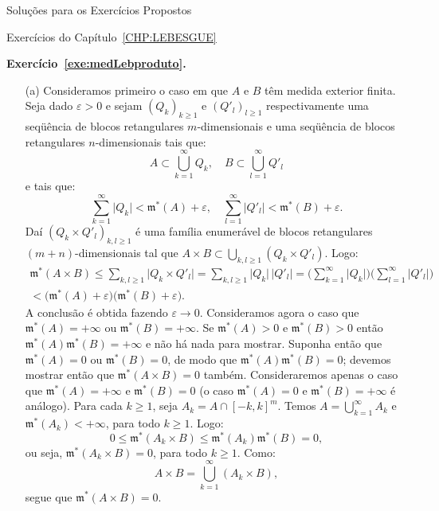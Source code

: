 \documentclass[oneside,final,11pt]{amsbook}
\newcommand{\leb}{\mathfrak m}
\theoremstyle{remark}\newtheorem{exercise}{Exercício}[chapter]
\theoremstyle{remark}\newtheorem{*exercise}[exercise]{\hbox to 0pt{\hskip 0pt minus 1fil*}Exercício}
\theoremstyle{definition}\newtheorem{exdefin}{Definição}[chapter]
\theoremstyle{plain}\newtheorem{teo}{Teorema}[section]
\theoremstyle{plain}\newtheorem{lem}[teo]{Lema}
\theoremstyle{plain}\newtheorem{prop}[teo]{Proposição}
\theoremstyle{plain}\newtheorem{cor}[teo]{Corolário}
\theoremstyle{definition}\newtheorem{defin}[teo]{Definição}
\theoremstyle{remark}\newtheorem{rem}[teo]{Observação}
\theoremstyle{definition}\newtheorem{notation}[teo]{Notação}
\theoremstyle{definition}\newtheorem{convention}[teo]{Convenção}
\theoremstyle{definition}\newtheorem{example}[teo]{Exemplo}
\numberwithin{section}{chapter}
\numberwithin{equation}{section}
\begin{document}
\begin{chapter}{Soluções para os Exercícios Propostos}
\begin{section}{Exercícios do Capítulo~\ref{CHP:LEBESGUE}}
\medskip

\textbf{Exercício~\ref{exe:medLebproduto}.}
\begin{itemize}
\item[(a)] Consideramos primeiro o caso em que $A$ e $B$ têm medida exterior finita.
Seja dado $\varepsilon>0$ e sejam $(Q_k)_{k\ge1}$ e $(Q'_l)_{l\ge1}$ respectivamente
uma seqüência de blocos retangulares $m$-dimensionais e uma seqüência de blocos retangulares
$n$-dimensionais tais que:
\[A\subset\bigcup_{k=1}^\infty Q_k,\quad B\subset\bigcup_{l=1}^\infty Q'_l\]
e tais que:
\[\sum_{k=1}^\infty\vert Q_k\vert<\leb^*(A)+\varepsilon,\quad\sum_{l=1}^\infty\vert Q'_l\vert<\leb^*(B)+\varepsilon.\]
Daí $(Q_k\times Q'_l)_{k,l\ge1}$ é uma família enumerável de blocos retangulares $(m+n)$-dimensionais
tal que $A\times B\subset\bigcup_{k,l\ge1}(Q_k\times Q'_l)$. Logo:
\begin{multline*}
\leb^*(A\times B)\le\sum_{k,l\ge1}\vert Q_k\times Q'_l\vert=\sum_{k,l\ge1}\vert Q_k\vert\,\vert Q'_l\vert
=\Big(\sum_{k=1}^\infty\vert Q_k\vert\Big)\Big(\sum_{l=1}^\infty\vert Q'_l\vert\Big)\\
<\big(\leb^*(A)+\varepsilon\big)\big(\leb^*(B)+\varepsilon\big).
\end{multline*}
A conclusão é obtida fazendo $\varepsilon\to0$. Consideramos agora o caso que $\leb^*(A)=+\infty$
ou $\leb^*(B)=+\infty$. Se $\leb^*(A)>0$ e $\leb^*(B)>0$ então $\leb^*(A)\leb^*(B)=+\infty$ e não há nada para mostrar.
Suponha então que $\leb^*(A)=0$ ou $\leb^*(B)=0$, de modo que $\leb^*(A)\leb^*(B)=0$; devemos mostrar então que
$\leb^*(A\times B)=0$ também. Consideraremos apenas o caso que $\leb^*(A)=+\infty$ e $\leb^*(B)=0$ (o caso $\leb^*(A)=0$
e $\leb^*(B)=+\infty$ é análogo). Para cada $k\ge1$, seja $A_k=A\cap[-k,k]^m$. Temos
$A=\bigcup_{k=1}^\infty A_k$ e $\leb^*(A_k)<+\infty$, para todo $k\ge1$. Logo:
\[0\le\leb^*(A_k\times B)\le\leb^*(A_k)\leb^*(B)=0,\]
ou seja, $\leb^*(A_k\times B)=0$, para todo $k\ge1$. Como:
\[A\times B=\bigcup_{k=1}^\infty(A_k\times B),\]
segue que $\leb^*(A\times B)=0$.

\smallskip


\end{itemize}
\end{section}
\end{chapter}
\end{document}
